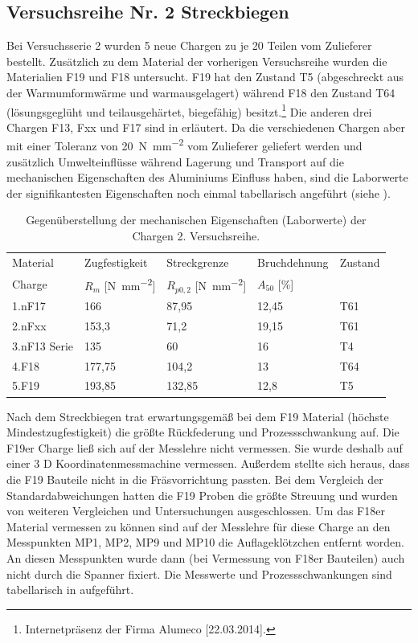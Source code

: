 \documentclass[12pt,a4paper,parskip,twoside,BCOR5mm,headsepline]{scrartcl}
\begin{document}
\newpage
\subsection{Versuchsreihe Nr. 2 Streckbiegen}
\label{sec:versuchsreihe2}
Bei Versuchsserie 2 wurden 5 neue Chargen zu je 20 Teilen vom Zulieferer bestellt. Zusätzlich zu dem Material der vorherigen Versuchsreihe wurden die Materialien F19 und F18 untersucht. F19 hat den Zustand T5 (abgeschreckt aus der Warmumformwärme und warmausgelagert) während F18 den Zustand T64 (lösungsgeglüht und teilausgehärtet, biegefähig) besitzt.\footnote{Internetpräsenz der Firma Alumeco [22.03.2014].}  Die anderen drei Chargen F13, Fxx und F17 sind in  erläutert. Da die verschiedenen Chargen aber mit einer Toleranz von \SI{20}{\newton\per\milli\meter\squared} vom Zulieferer geliefert werden und zusätzlich Umwelteinflüsse während Lagerung und Transport auf die mechanischen Eigenschaften des Aluminiums Einfluss haben,  sind die Laborwerte der signifikantesten Eigenschaften noch einmal tabellarisch angeführt (siehe ).\\
\begin{table}[hbtp]
\caption{Gegenüberstellung der mechanischen Eigenschaften (Laborwerte) der Chargen 2. Versuchsreihe.}
\label{tab:eigenschaften2}
\centering
\begin{tabular}{lllll}
\toprule
Material & Zugfestigkeit & Streckgrenze & Bruchdehnung & Zustand \\
Charge &  $R_m$ [\si{\newton\per\milli\meter\squared}] &  $R_{p0,2}$ [\si{\newton\per\milli\meter\squared}] &  $A_{50}$ [\%] & \\
\midrule
1.nF17 & 166 & 87,95 & 12,45 & T61 \\
2.nFxx & 153,3 & 71,2 &  19,15 & T61 \\
3.nF13 Serie & 135 & 60 & 16  & T4 \\
4.F18 & 177,75 & 104,2 & 13 & T64 \\
5.F19 & 193,85 & 132,85 & 12,8 &  T5 \\

\bottomrule




\end{tabular}
\end{table}

 
Nach dem Streckbiegen trat erwartungsgemäß bei dem F19 Material (höchste Mindestzugfestigkeit) die größte Rückfederung und Prozessschwankung auf. Die F19er Charge ließ sich auf der Messlehre nicht vermessen. Sie wurde deshalb auf einer 3 D Koordinatenmessmachine vermessen.  Außerdem stellte sich heraus, dass die F19 Bauteile nicht in die Fräsvorrichtung passten. Bei dem Vergleich der Standardabweichungen hatten die  F19 Proben  die größte Streuung und wurden von weiteren Vergleichen und Untersuchungen ausgeschlossen. Um das F18er Material  vermessen zu können sind auf der Messlehre für diese Charge  an den Messpunkten MP1, MP2, MP9 und MP10 die Auflageklötzchen entfernt worden. An diesen Messpunkten wurde dann (bei Vermessung von F18er Bauteilen) auch nicht durch die Spanner fixiert. Die Messwerte und Prozessschwankungen sind tabellarisch in  aufgeführt.
\end{document}
